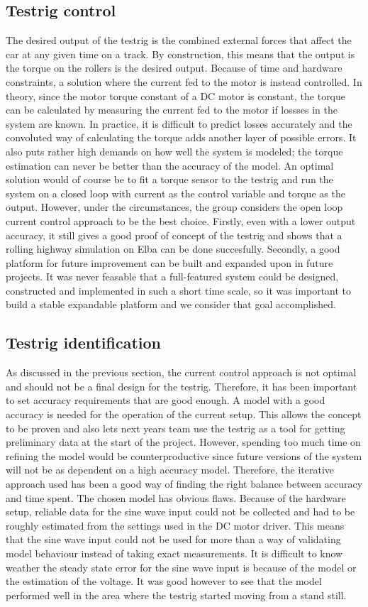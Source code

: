 \subsection{Testrig control}
The desired output of the testrig is the combined external forces that affect
the car at any given time on a track. By construction, this means that the
output is the torque on the rollers is the desired output. Because of time
and hardware constraints, a solution where the current fed to the motor is
instead controlled. In theory, since the motor torque constant of a DC motor is
constant, the torque can be calculated by measuring the current fed to the
motor if lossses in the system are known. In practice, it is difficult to
predict losses accurately and the convoluted way of calculating the torque adds
another layer of possible errors. It also puts rather high demands on how well
the system is modeled; the torque estimation can never be better than the
accuracy of the model. An optimal solution would of course be to fit a torque
sensor to the testrig and run the system on a closed loop with current as the
control variable and torque as the output. However, under the
circumstances, the group considers the open loop current control approach to be
the best choice. Firstly, even with a lower output accuracy, it still gives a
good proof of concept of the testrig and shows that a rolling highway simulation
on Elba can be done succesfully. Secondly, a good platform for future
improvement can be built and expanded upon in future projects. It was never
feasable that a full-featured system could be designed, constructed and
implemented in such a short time scale, so it was important to build a stable
expandable platform and we consider that goal accomplished.

\subsection{Testrig identification}
As discussed in the previous section, the current control approach is not
optimal and should not be a final design for the testrig. Therefore, it has been
important to set accuracy requirements that are good enough. A model with a
good accuracy is needed for the operation of the current setup. This allows the
concept to be proven and also lets next years team use the testrig as a tool for
getting preliminary data at the start of the project. However, spending too much
time on refining the model would be counterproductive since future versions of
the system will not be as dependent on a high accuracy model. Therefore, the
iterative approach used has been a good way of finding the right balance between
accuracy and time spent. The chosen model has obvious flaws.  Because of the
hardware setup, reliable data for the sine wave input could not be collected and
had to be roughly estimated from the settings used in the DC motor driver. This
means that the sine wave input could not be used for more than a way of
validating model behaviour instead of taking exact measurements.  It is
difficult to know weather the steady state error for the sine wave input is
because of the model or the estimation of the voltage.  It was good however to
see that the model performed well in the area where the testrig started moving
from a stand still. 

